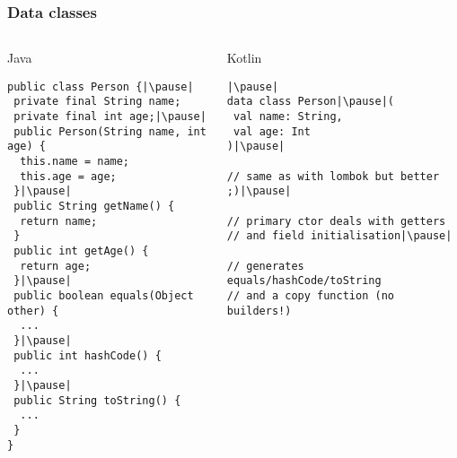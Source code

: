 
\begin{frame}[fragile]
\frametitle{Data classes}
\pause
\begin{columns}[t]
\begin{column}{0.5\textwidth}
\begin{center}
  Java
\end{center}
\begin{lstlisting}[style=twosided]
public class Person {|\pause|
 private final String name;
 private final int age;|\pause|
 public Person(String name, int age) {
  this.name = name;
  this.age = age;
 }|\pause|
 public String getName() {
  return name;
 }
 public int getAge() {
  return age;
 }|\pause|
 public boolean equals(Object other) {
  ...
 }|\pause|
 public int hashCode() {
  ...
 }|\pause|
 public String toString() {
  ...
 }
}
\end{lstlisting}

\end{column}
\begin{column}{0.5\textwidth}
\begin{center}
  Kotlin
\end{center}
\begin{lstlisting}[style=twosided]|\pause|
data class Person|\pause|(
 val name: String,
 val age: Int
)|\pause|

// same as with lombok but better ;)|\pause|

// primary ctor deals with getters
// and field initialisation|\pause|

// generates equals/hashCode/toString
// and a copy function (no builders!)
\end{lstlisting}
\end{column}
\end{columns}
\end{frame}





